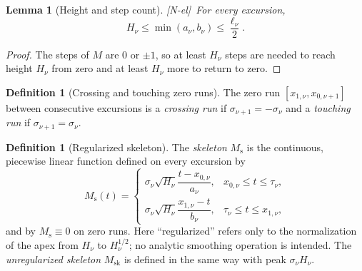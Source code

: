 \documentclass[11pt]{amsart}
\numberwithin{equation}{section}
\theoremstyle{plain}
\newtheorem{lemma}[theorem]{Lemma}
\theoremstyle{definition}
\newtheorem{definition}[theorem]{Definition}
\theoremstyle{remark}
\newcommand{\Ms}{M_{\mathrm{s}}}
\newcommand{\Msk}{M_{\mathrm{sk}}}
\newcommand{\tagNE}{\textup{[N-el]}}
\begin{document}
\begin{lemma}[Height and step count]
\label{lem:height_steps}
\tagNE\ For every excursion,
\begin{equation}
\label{eq:height_steps}
H_\nu\le\min(a_\nu,b_\nu)\le\frac{\ell_\nu}{2}.
\end{equation}
\end{lemma}

\begin{proof}
The steps of $M$ are $0$ or $\pm1$, so at least $H_\nu$ steps are needed to
reach height $H_\nu$ from zero and at least $H_\nu$ more to return to zero.
\end{proof}

\begin{definition}[Crossing and touching zero runs]
\label{def:crossing_touching}
The zero run $[x_{1,\nu},x_{0,\nu+1}]$ between consecutive excursions is a
\emph{crossing run} if $\sigma_{\nu+1}=-\sigma_\nu$ and a \emph{touching run}
if $\sigma_{\nu+1}=\sigma_\nu$.
\end{definition}

\begin{definition}[Regularized skeleton]
\label{def:Ms}
The \emph{skeleton} $\Ms$ is the continuous, piecewise linear function
defined on every excursion by
\begin{equation}
\label{eq:Ms_def}
\Ms(t)=
\begin{cases}
\sigma_\nu\sqrt{H_\nu}\dfrac{t-x_{0,\nu}}{a_\nu},
 &x_{0,\nu}\le t\le\tau_\nu,\\[2ex]
\sigma_\nu\sqrt{H_\nu}\dfrac{x_{1,\nu}-t}{b_\nu},
 &\tau_\nu\le t\le x_{1,\nu},
\end{cases}
\end{equation}
and by $\Ms\equiv0$ on zero runs.  Here ``regularized'' refers only to
the normalization of the apex from $H_\nu$ to $H_\nu^{1/2}$; no analytic
smoothing operation is intended.  The \emph{unregularized skeleton} $\Msk$
is defined in the same way with peak $\sigma_\nu H_\nu$.
\end{definition}
\end{document}
